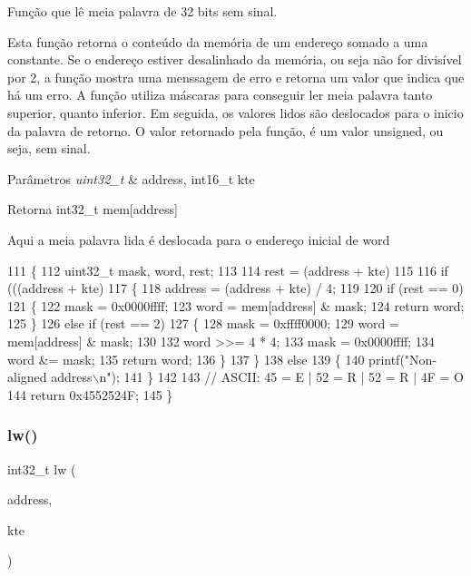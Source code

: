 Função que lê meia palavra de 32 bits sem sinal. 

Esta função retorna o conteúdo da memória de um endereço somado a uma constante. Se o endereço estiver desalinhado da memória, ou seja não for divisível por 2, a função mostra uma menssagem de erro e retorna um valor que indica que há um erro. A função utiliza máscaras para conseguir ler meia palavra tanto superior, quanto inferior. Em seguida, os valores lidos são deslocados para o inicio da palavra de retorno. O valor retornado pela função, é um valor unsigned, ou seja, sem sinal. 
\begin{DoxyParams}{Parâmetros}
{\em uint32\+\_\+t} & address, int16\+\_\+t kte \\
\hline
\end{DoxyParams}
\begin{DoxyReturn}{Retorna}
int32\+\_\+t mem[address] 
\end{DoxyReturn}
Aqui a meia palavra lida é deslocada para o endereço inicial de word 
\begin{DoxyCode}
111 \{
112     uint32\_t mask, word, rest;
113 
114     rest = (address + kte) %
115 
116     \textcolor{keywordflow}{if} (((address + kte) %
117     \{
118         address = (address + kte) / 4;
119 
120         \textcolor{keywordflow}{if} (rest == 0)
121         \{
122             mask = 0x0000ffff;
123             word = mem[address] & mask;
124             \textcolor{keywordflow}{return} word;
125         \}
126         \textcolor{keywordflow}{else} \textcolor{keywordflow}{if} (rest == 2)
127         \{
128             mask = 0xffff0000;
129             word = mem[address] & mask;
130 
132             word >>= 4 * 4;
133             mask = 0x0000ffff;
134             word &= mask;
135             \textcolor{keywordflow}{return} word;
136         \}
137     \}
138     \textcolor{keywordflow}{else}
139     \{
140         printf(\textcolor{stringliteral}{"Non-aligned address\(\backslash\)n"});
141     \}
142 
143     \textcolor{comment}{// ASCII: 45 = E | 52 = R | 52 = R | 4F = O}
144     \textcolor{keywordflow}{return} 0x4552524F;
145 \}
\end{DoxyCode}
\mbox{\label{memory_8c_a5e72ee24dad88a38f4f3a6b3ea9973ed}} 
\subsubsection{lw()}
{\footnotesize\ttfamily int32\+\_\+t lw (\begin{DoxyParamCaption}\item[{uint32\+\_\+t}]{address,  }\item[{int16\+\_\+t}]{kte }\end{DoxyParamCaption})}




